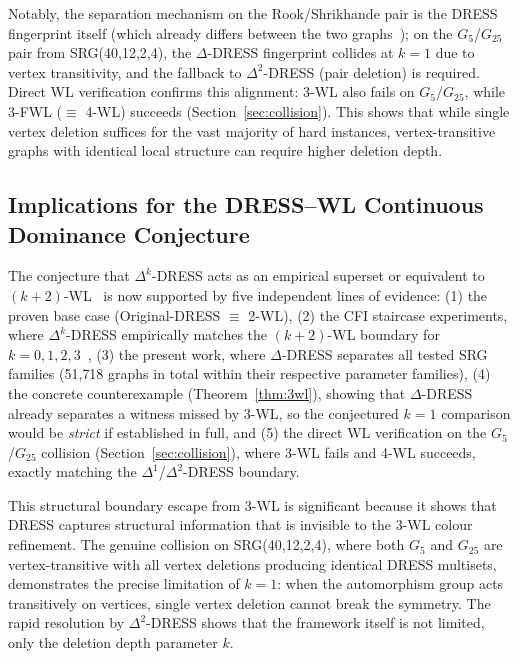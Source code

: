 \documentclass[11pt,a4paper]{article}
\begin{document}
Notably, the separation mechanism on the Rook/Shrikhande pair is the DRESS fingerprint itself (which already differs between the two graphs~\cite{castrillo2026dress}); on the $G_5$/$G_{25}$ pair from SRG(40,12,2,4), the $\Delta$-DRESS fingerprint collides at $k = 1$ due to vertex transitivity, and the fallback to $\Delta^2$-DRESS (pair deletion) is required.
Direct WL verification confirms this alignment: 3-WL also fails on $G_5$/$G_{25}$, while 3-FWL ($\equiv$ 4-WL) succeeds (Section~\ref{sec:collision}).
This shows that while single vertex deletion suffices for the vast majority of hard instances, vertex-transitive graphs with identical local structure can require higher deletion depth.


\subsection{Implications for the DRESS--WL Continuous Dominance Conjecture}

The conjecture that $\Delta^k$-DRESS acts as an empirical superset or equivalent to $(k{+}2)$-WL~\cite{castrillo2026dress} is now supported by five independent lines of evidence:
(1) the proven base case (Original-DRESS $\equiv$ 2-WL),
(2) the CFI staircase experiments, where $\Delta^k$-DRESS empirically matches the $(k{+}2)$-WL boundary for $k = 0, 1, 2, 3$~\cite{castrillo2026dress},
(3) the present work, where $\Delta$-DRESS separates all tested SRG families (51{,}718 graphs in total within their respective parameter families),
(4) the concrete counterexample (Theorem~\ref{thm:3wl}), showing that $\Delta$-DRESS already separates a witness missed by 3-WL, so the conjectured $k = 1$ comparison would be \emph{strict} if established in full, and
(5) the direct WL verification on the $G_5$/$G_{25}$ collision (Section~\ref{sec:collision}), where 3-WL fails and 4-WL succeeds, exactly matching the $\Delta^1$/$\Delta^2$-DRESS boundary.

This structural boundary escape from 3-WL is significant because it shows that DRESS captures structural information that is invisible to the 3-WL colour refinement.
The genuine collision on SRG(40,12,2,4), where both $G_5$ and $G_{25}$ are vertex-transitive with all vertex deletions producing identical DRESS multisets, demonstrates the precise limitation of $k = 1$: when the automorphism group acts transitively on vertices, single vertex deletion cannot break the symmetry.
The rapid resolution by $\Delta^2$-DRESS shows that the framework itself is not limited, only the deletion depth parameter $k$.
\end{document}

